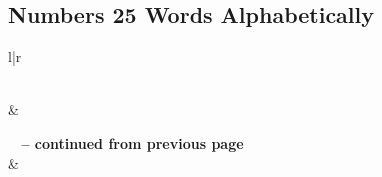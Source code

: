 

\subsection{Numbers 25 Words Alphabetically}


\normalsize
 
\begin{center}
\begin{longtable}{l|r}
\caption[Numbers 25 Words Alphabetically]{Numbers 25 Words Alphabetically}\label{table:WordsAlphabetically for Numbers 25} \\
\hline {} &  \\ \hline 
\endfirsthead
 
{{\bfseries \tablename\ \thetable{} -- continued from previous page}} \\  
\hline {} &  \\ \hline 
\endhead
 

\end{longtable}
\end{center}
